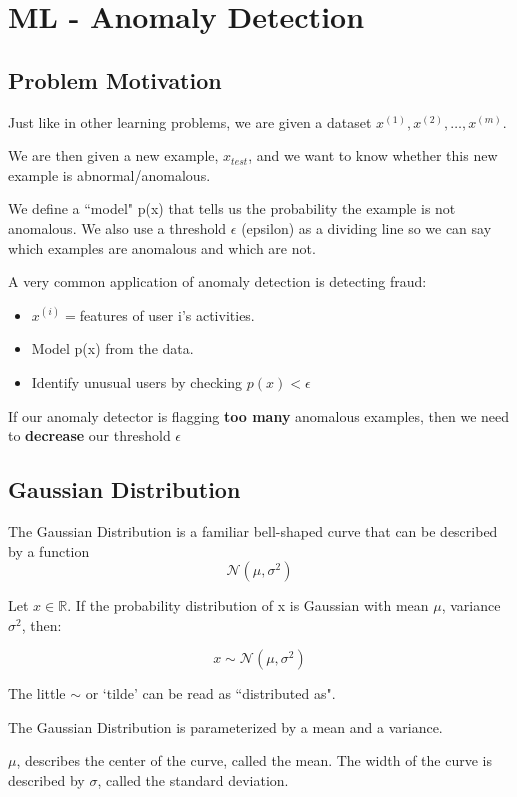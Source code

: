 \chapter{ML - Anomaly Detection}

\section{Problem Motivation}
Just like in other learning problems, we are given a dataset ${x^{(1)}, x^{(2)},\dots,x^{(m)}}$.

We are then given a new example, $x_{test}$, and we want to know whether this new example is abnormal/anomalous.

We define a ``model" p(x) that tells us the probability the example is not anomalous. We also use a threshold $\epsilon$ (epsilon) as a dividing line so we can say which examples are anomalous and which are not.

A very common application of anomaly detection is detecting fraud:

\begin{itemize}
\item $x^{(i)} = $features of user i's activities.
\item Model p(x) from the data.
\item Identify unusual users by checking $ p(x) < \epsilon$
\end{itemize}

If our anomaly detector is flagging \textbf{too many} anomalous examples, then we need to \textbf{decrease} our threshold $\epsilon$

\section{Gaussian Distribution}
The Gaussian Distribution is a familiar bell-shaped curve that can be described by a function 
$$\mathcal{N}(\mu,\sigma^2)$$

Let $x\in \mathbb{R}$. If the probability distribution of x is Gaussian with mean $\mu$, variance $\sigma^2$, then:

\begin{equation}
x \sim \mathcal{N}(\mu, \sigma^2)
\end{equation}

The little $\sim$ or `tilde' can be read as ``distributed as".


The Gaussian Distribution is parameterized by a mean and a variance.

$\mu$, describes the center of the curve, called the mean. The width of the curve is described by $\sigma$, called the standard deviation.

